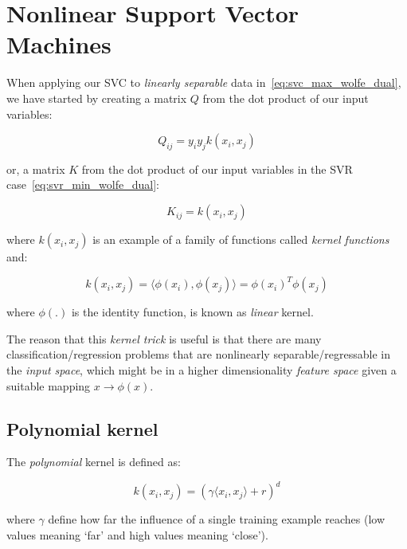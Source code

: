 \section{Nonlinear Support Vector Machines}

When applying our SVC to \emph{linearly separable} data in~\eqref{eq:svc_max_wolfe_dual}, we have started by creating a matrix $Q$ from the dot product of our input variables:

\begin{equation} \label{eq:svc_hessian}
	Q_{ij} = y_i y_j k(x_i,x_j)
\end{equation}

or, a matrix $K$ from the dot product of our input variables in the SVR case~\eqref{eq:svr_min_wolfe_dual}:

\begin{equation} \label{eq:svr_hessian}
	K_{ij} = k(x_i,x_j)
\end{equation}

where $k(x_i,x_j)$ is an example of a family of functions called \emph{kernel functions} and:  

\begin{equation} \label{eq:kernel_function}
	k(x_i,x_j) = \langle \phi(x_i), \phi(x_j) \rangle = \phi(x_i)^T \phi(x_j)
\end{equation}

where $\phi(.)$ is the identity function, is known as \emph{linear} kernel.

The reason that this \emph{kernel trick} is useful is that there are many classification/regression problems that are nonlinearly separable/regressable in the \emph{input space}, which might be in a higher dimensionality \emph{feature space} given a suitable mapping $x \rightarrow \phi(x)$.

\subsection{Polynomial kernel}

The \emph{polynomial} kernel is defined as:

\begin{equation} \label{eq:poly_kernel}
	k(x_i,x_j)=(\gamma \langle x_i, x_j\rangle + r)^d
\end{equation}

where $\gamma$ define how far the influence of a single training example reaches (low values meaning ‘far’ and high values meaning ‘close’).

